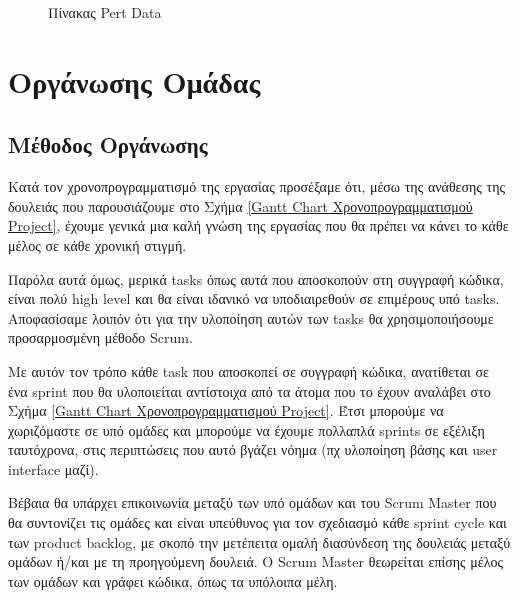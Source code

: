 \documentclass[12pt,a4paper]{article}
\begin{document}
\begin{figure}[H]
	\caption{Πίνακας Pert Data}
	\label{Πίνακας Pert Data}
\end{figure}


\section{Οργάνωσης Ομάδας}

\subsection{Μέθοδος Οργάνωσης}
Κατά τον χρονοπρογραμματισμό της εργασίας προσέξαμε ότι, μέσω της ανάθεσης της δουλειάς που παρουσιάζουμε στο Σχήμα \ref{Gantt Chart Χρονοπρογραμματισμού Project}, έχουμε γενικά μια καλή γνώση της εργασίας που θα πρέπει να κάνει το κάθε μέλος σε κάθε χρονική στιγμή. 

Παρόλα αυτά όμως, μερικά tasks όπως αυτά που αποσκοπούν στη συγγραφή κώδικα, είναι πολύ high level και θα είναι ιδανικό να υποδιαιρεθούν σε επιμέρους υπό tasks. Αποφασίσαμε λοιπόν ότι για την υλοποίηση αυτών των tasks θα χρησιμοποιήσουμε προσαρμοσμένη μέθοδο Scrum.

Με αυτόν τον τρόπο κάθε task που αποσκοπεί σε συγγραφή κώδικα, ανατίθεται σε ένα sprint που θα υλοποιείται αντίστοιχα από τα άτομα που το έχουν αναλάβει στο Σχήμα \ref{Gantt Chart Χρονοπρογραμματισμού Project}. Έτσι μπορούμε να χωριζόμαστε σε υπό ομάδες και μπορούμε να έχουμε πολλαπλά sprints σε εξέλιξη ταυτόχρονα, στις περιπτώσεις που αυτό βγάζει νόημα (πχ υλοποίηση βάσης και user interface μαζί).

Βέβαια θα υπάρχει επικοινωνία μεταξύ των υπό ομάδων και του Scrum Master που θα συντονίζει τις ομάδες και είναι υπεύθυνος για τον σχεδιασμό κάθε sprint cycle και των product backlog, με σκοπό την μετέπειτα ομαλή διασύνδεση της δουλειάς μεταξύ ομάδων ή/και με τη προηγούμενη δουλειά. Ο Scrum Master θεωρείται επίσης μέλος των ομάδων και γράφει κώδικα, όπως τα υπόλοιπα μέλη.
\end{document}
